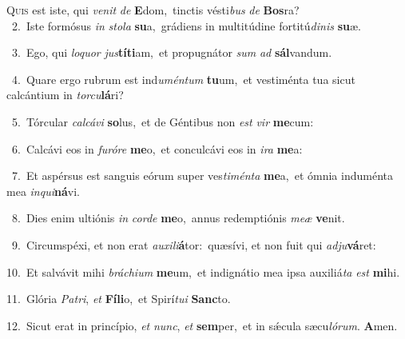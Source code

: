\lettrine{\initial\textcolor{\initialcolor}{Q}}{uis} est iste, qui \textit{ve}\-\textit{nit} \textit{de} \textbf{E}\-dom,~\star tinctis vésti\textit{bus} \textit{de} \textbf{Bos}\-ra?\\
{\numbfont\textcolor{\numbcolor}{~2.}}~Iste formósus \textit{in} \textit{sto}\-\textit{la} \textbf{su}\-a,~\star grádiens in multitúdine fortitú\-\textit{di}\-\textit{nis} \textbf{su}\-æ.\par
{\numbfont\textcolor{\numbcolor}{~3.}}~Ego, qui \textit{lo}\-\textit{quor} \textit{jus}\-\textbf{tí}\textbf{ti}am,~\star et propugnátor \textit{sum} \textit{ad} \textbf{sál}\-vandum.\par
{\numbfont\textcolor{\numbcolor}{~4.}}~Quare ergo rubrum est ind\-\textit{u}\-\textit{mén}\textit{tum} \textbf{tu}\-um,~\star et vestiménta tua sicut calcántium in \textit{tor}\-\textit{cu}\textbf{lá}ri?\par
{\numbfont\textcolor{\numbcolor}{~5.}}~Tórcular \textit{cal}\-\textit{cá}\textit{vi} \textbf{so}\-lus,~\star et de Géntibus non \textit{est} \textit{vir} \textbf{me}\-cum:\par
{\numbfont\textcolor{\numbcolor}{~6.}}~Calcávi eos in \textit{fu}\-\textit{ró}\textit{re} \textbf{me}\-o,~\star et conculcávi eos in \textit{i}\-\textit{ra} \textbf{me}\-a:\par
{\numbfont\textcolor{\numbcolor}{~7.}}~Et aspérsus est sanguis eórum super ves\-\textit{ti}\-\textit{mén}\textit{ta} \textbf{me}\-a,~\star et ómnia induménta mea \textit{in}\-\textit{qui}\textbf{ná}vi.\par
{\numbfont\textcolor{\numbcolor}{~8.}}~Dies enim ultiónis \textit{in} \textit{cor}\-\textit{de} \textbf{me}\-o,~\star annus redemptiónis \textit{me}\-\textit{æ} \textbf{ve}\-nit.\par
{\numbfont\textcolor{\numbcolor}{~9.}}~Circumspéxi, et non erat \textit{au}\-\textit{xi}\textit{li}\textbf{á}tor:~\star quæsívi, et non fuit qui \textit{ad}\-\textit{ju}\textbf{vá}ret:\par
{\numbfont\textcolor{\numbcolor}{10.}}~Et salvávit mihi \textit{brá}\-\textit{chi}\textit{um} \textbf{me}\-um,~\star et indignátio mea ipsa auxiliá\textit{ta} \textit{est} \textbf{mi}\-hi.\par
{\numbfont\textcolor{\numbcolor}{11.}}~Glória \textit{Pa}\-\textit{tri}, \textit{et} \textbf{Fí}\-\textbf{li}o,~\star et Spirí\-\textit{tu}\-\textit{i} \textbf{Sanc}\-to.\par
{\numbfont\textcolor{\numbcolor}{12.}}~Sicut erat in princípio, \textit{et} \textit{nunc}\-, \textit{et} \textbf{sem}\-per,~\star et in sǽcula sæcu\-\textit{ló}\-\textit{rum}. \textbf{A}\-men.\par
